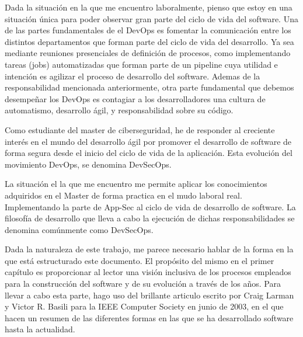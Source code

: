 \documentclass[12pt]{report} %
\begin{document}
Dada la situación en la que me encuentro laboralmente, pienso que estoy en una 
situación única para poder observar gran parte del ciclo de vida del software.
Una de las partes fundamentales de el DevOps es fomentar la comunicación entre
los distintos departamentos que forman parte del ciclo de vida del desarrollo.
Ya sea mediante reuniones presenciales de definición de procesos, como
implementando tareas (jobs) automatizadas que forman parte de un pipeline cuya
utilidad e intención es agilizar el proceso de desarrollo del software.
Ademas de la responsabilidad mencionada anteriormente, otra parte fundamental
que debemos desempeñar los DevOps es contagiar a los desarrolladores una
cultura de automatismo, desarrollo ágil, y responsabilidad sobre su código.  

Como estudiante del master de ciberseguridad, he de responder al creciente
interés en el mundo del desarrollo ágil por promover el desarrollo de software
de forma segura desde el inicio del ciclo de vida de la aplicación.
Esta evolución del movimiento DevOps, se denomina DevSecOps.
 
La situación el la que me encuentro me permite aplicar los conocimientos
adquiridos en el Master de forma practica en el mudo laboral real.
Implementando la parte de \gls{App-Sec} al ciclo de vida de desarrollo de
software.
La filosofía de desarrollo que lleva a cabo la ejecución de dichas
responsabilidades se denomina comúnmente como DevSecOps.


Dada la naturaleza de este trabajo, me parece necesario hablar de la forma en
la que está estructurado este documento.
El propósito del mismo en el primer capítulo es proporcionar al lector una
visión inclusiva de los procesos empleados para la construcción del software y
de su evolución a través de los años.
Para llevar a cabo esta parte, hago uso del brillante articulo escrito por 
Craig Larman y Victor R. Basili para la IEEE Computer Society en junio de 2003,
en el que hacen un resumen de las diferentes formas en las que se ha 
desarrollado software hasta la actualidad.
\end{document}

